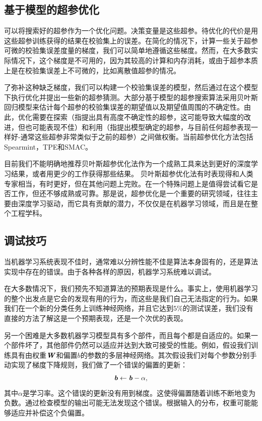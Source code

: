 \subsection{基于模型的超参优化}
\label{sec:11.4.5}

可以将搜索好的超参作为一个优化问题。决策变量是这些超参。待优化的代价是用这些超参训练获得的结果在校验集上的误差。在简化的情况下，计算一些关于超参可微的校验集误差度量的梯度，我们可以简单地遵循这些梯度\citep{bengio:1999:snowbird,bengio-hyper-NC00,maclaurin2015gradient}。然而，在大多数实际情况下，这个梯度是不可用的，因为其较高的计算和内存消耗，或由于超参本质上是在校验集误差上不可微的，比如离散值超参的情况。

了弥补这种缺乏梯度，我们可以构建一个校验集误差的模型，然后通过在这个模型下执行优化并提出一些新的超参猜测。大部分基于模型的超参搜索算法采用贝叶斯回归模型来估计每个超参的校验集误差的期望值以及期望值周围的不确定性。由此，优化需要在探索（指提出具有高度不确定性的超参，这可能导致大幅度的改进，但也可能表现不佳）和利用（指提出模型确定的超参，与目前任何超参表现一样好-通常这些超参非常类似于之前的超参）之间做权衡。当前超参优化方法包括Spearmint\citep{Snoek+al-NIPS2012-small}，TPE\citep{Bergstra+al-NIPS2011}和SMAC\citep{hutter+hoos+leyton+brown:2011}。

目前我们不能明确地推荐贝叶斯超参优化法作为一个成熟工具来达到更好的深度学习结果，或者用更少的工作获得那些结果。 贝叶斯超参优化法有时表现得和人类专家相当，有时更好，但在其他问题上完败。在一个特殊问题上是值得尝试看它是否工作，但还不够成熟或可靠。那是说，超参优化是一个重要的研究领域，往往主要由深度学习驱动，而它具有贡献的潜力，不仅仅是在机器学习领域，而且是在整个工程学科。

\subsection{调试技巧}
\label{sec:11.5}

当机器学习系统表现不佳时，通常难以分辨性能不佳是算法本身固有的，还是算法实现中存在的错误。由于各种各样的原因，机器学习系统难以调试。

在大多数情况下，我们预先不知道算法的预期表现是什么。事实上，使用机器学习的整个出发点是它会的发现有用的行为，而这些是我们自己无法指定的行为。如果我们在一个新的分类任务上训练神经网络，并且它达到$5\%$的测试误差，我们没有直接的方法了解这是一个预期表现，还是一个次优的表现。

另一个困难是大多数机器学习模型具有多个部件，而且每个都是自适应的。如果一个部件坏了，其他部件仍然可以适应并达到大致可接受的性能。例如，假设我们训练具有由权重$\boldsymbol{\mathit{W}}$和偏置$b$的参数的多层神经网络。其次假设我们对每个参数分别手动实现了梯度下降规则，我们做了一个错误的偏置的更新：
\begin{equation}
    \boldsymbol{\mathit{b}} \leftarrow \boldsymbol{\mathit{b}} - \alpha,
\end{equation}
其中$\alpha$是学习率。这个错误的更新没有用到梯度。这使得偏置随着训练不断地变为负数。通过检查模型的输出可能无法发现这个错误。根据输入的分布，权重可能能够适应并补偿这个负偏置。

